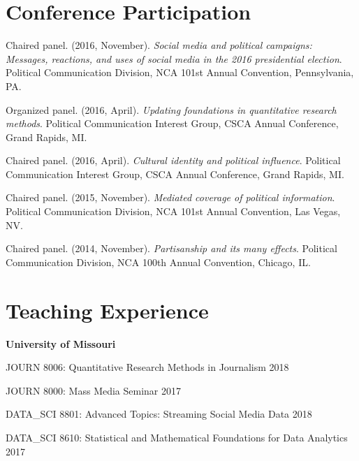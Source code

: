 \documentclass[11pt,letterpaper]{article}
\begin{document}
\section{Conference Participation}
  \begin{bibenum}
    \item[] Chaired panel. (2016, November). \textit{Social media and
      political campaigns: Messages, reactions, and uses of social media
      in the 2016 presidential election}.
      Political Communication Division, NCA 101st Annual Convention,
      Pennsylvania, PA.

    \item[] Organized panel. (2016, April). \textit{Updating foundations in
      quantitative research methods}. Political Communication Interest
      Group, CSCA Annual Conference, Grand Rapids, MI.

    \item[] Chaired panel. (2016, April). \textit{Cultural identity and
      political influence}.
      Political Communication Interest Group, CSCA Annual Conference,
      Grand Rapids, MI.

    \item[] Chaired panel. (2015, November). \textit{Mediated coverage of
      political information}. Political Communication Division, NCA
      101st Annual Convention, Las Vegas, NV.

    \item[] Chaired panel. (2014, November). \textit{Partisanship and its
      many effects}. Political Communication Division, NCA 100th Annual
      Convention, Chicago, IL.
  \end{bibenum}

\section{Teaching Experience}
\textbf{University of Missouri}
\begin{innerlist}
  \item JOURN 8006: Quantitative Research Methods in Journalism \hfill 2018
  \item JOURN 8000: Mass Media Seminar \hfill 2017
  \item DATA\_SCI 8801: Advanced Topics: Streaming Social Media Data \hfill 2018
  \item DATA\_SCI 8610: Statistical and Mathematical Foundations for Data Analytics \hfill 2017
    \item[]
\end{innerlist}
\vspace{-.075in}
\end{document}

